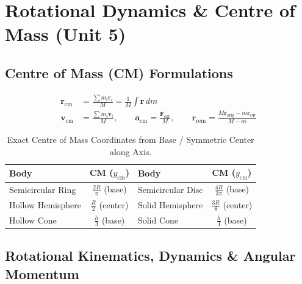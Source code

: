 \documentclass[10pt,twoside,openright]{book}
\begin{document}
\section{Rotational Dynamics \& Centre of Mass (Unit 5)}

\subsection{Centre of Mass (CM) Formulations}

\begin{formulabox}
\begin{align}
  \mathbf{r}_{\text{cm}} &= \frac{\sum m_i \mathbf{r}_i}{M} = \frac{1}{M}\int \mathbf{r}\,dm \\
  \mathbf{v}_{\text{cm}} &= \frac{\sum m_i \mathbf{v}_i}{M}, \qquad \mathbf{a}_{\text{cm}} = \frac{\mathbf{F}_{\text{ext}}}{M}, \qquad \mathbf{r}_{\text{rem}} = \frac{M\mathbf{r}_{\text{orig}} - m\mathbf{r}_{\text{cut}}}{M - m}
\end{align}
\end{formulabox}

\begin{table}[htbp]
\centering
\footnotesize
\setlength{\tabcolsep}{3pt}
\renewcommand{\arraystretch}{1.2}
\begin{tabularx}{\textwidth}{L c L c}
\toprule
\textbf{Body} & \textbf{CM ($y_{\text{cm}}$)} & \textbf{Body} & \textbf{CM ($y_{\text{cm}}$)} \\
\midrule
Semicircular Ring & $\frac{2R}{\pi}$ (base) & Semicircular Disc & $\frac{4R}{3\pi}$ (base) \\
Hollow Hemisphere & $\frac{R}{2}$ (center) & Solid Hemisphere & $\frac{3R}{8}$ (center) \\
Hollow Cone & $\frac{h}{3}$ (base) & Solid Cone & $\frac{h}{4}$ (base) \\
\bottomrule
\end{tabularx}
\caption{Exact Centre of Mass Coordinates from Base / Symmetric Center along Axis.}
\end{table}

\subsection{Rotational Kinematics, Dynamics \& Angular Momentum}
\end{document}
